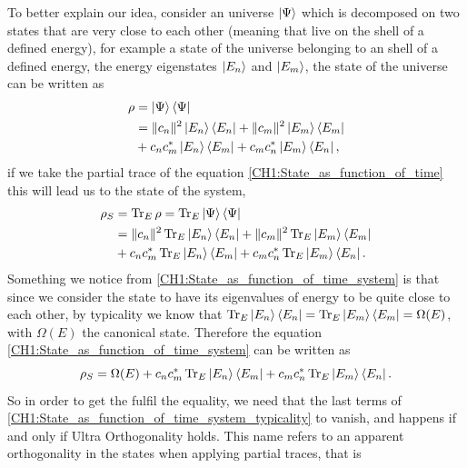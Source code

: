 \indent To better explain our idea, consider an universe $\mathinner{|{\Psi}\rangle}$ which is decomposed on two states that are very close to each other (meaning that live on the shell of a defined energy), for example a state of the universe belonging to an shell of a defined energy, the energy eigenstates $\mathinner{|{E_n}\rangle}$ and $\mathinner{|{E_m}\rangle}$, the state of the universe can be written as
\begin{equation}
\begin{aligned}
\rho &= \mathinner{|{\Psi}\rangle}\mathinner{\langle{\Psi}|}\\
&= \|c_n\|^2 \mathinner{|{E_n}\rangle}\mathinner{\langle{E_n}|} +  \|c_m\|^2 \mathinner{|{E_m}\rangle}\mathinner{\langle{E_m}|} \\
& + c_n c^{*}_m  \mathinner{|{E_n}\rangle}\mathinner{\langle{E_m}|}+ c_m c^{*}_n \mathinner{|{E_m}\rangle}\mathinner{\langle{E_n}|},
\end{aligned}
\label{CH1:State_as_function_of_time}
\end{equation}
if we take the partial trace of the equation \eqref{CH1:State_as_function_of_time} this will lead us to the state of the system,
\begin{equation}
\begin{aligned}
\rho_S &= \operatorname{Tr}_E \rho = \operatorname{Tr}_E  \mathinner{|{\Psi}\rangle}\mathinner{\langle{\Psi}|}\\
&= \|c_n\|^2\operatorname{Tr}_E  \mathinner{|{E_n}\rangle}\mathinner{\langle{E_n}|} +  \|c_m\|^2 \operatorname{Tr}_E \mathinner{|{E_m}\rangle}\mathinner{\langle{E_m}|} \\
& + c_n c^{*}_m  \operatorname{Tr}_E \mathinner{|{E_n}\rangle}\mathinner{\langle{E_m}|} + c_m c^{*}_n \operatorname{Tr}_E \mathinner{|{E_m}\rangle}\mathinner{\langle{E_n}|}.
\end{aligned}
\label{CH1:State_as_function_of_time_system}
\end{equation}
\indent Something we notice from \eqref{CH1:State_as_function_of_time_system} is that since we consider the state to have its eigenvalues of energy to be quite close to each other, by typicality we know that $\operatorname{Tr}_E \mathinner{|{E_n}\rangle}\mathinner{\langle{E_n}|} =\operatorname{Tr}_E \mathinner{|{E_m}\rangle}\mathinner{\langle{E_m}|} = \Omega(E)$, with $\Omega(E)$ the canonical state. Therefore the equation \eqref{CH1:State_as_function_of_time_system} can be written as
\begin{equation}
\rho_S= \Omega(E) + c_n c^{*}_m  \operatorname{Tr}_E \mathinner{|{E_n}\rangle}\mathinner{\langle{E_m}|} + c_m c^{*}_n \operatorname{Tr}_E \mathinner{|{E_m}\rangle}\mathinner{\langle{E_n}|}.
\label{CH1:State_as_function_of_time_system_typicality}
\end{equation}
\indent So in order to get the fulfil the equality, we need that the last terms of \eqref{CH1:State_as_function_of_time_system_typicality} to vanish, and happens if and only if Ultra Orthogonality holds. This name refers to an apparent orthogonality in the states when applying partial traces, that is


